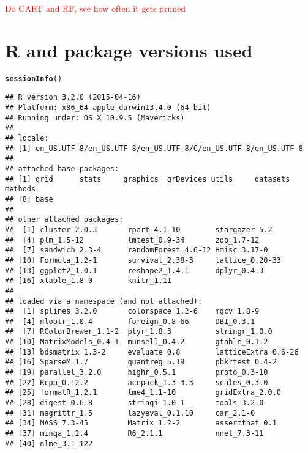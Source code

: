 \documentclass[11pt]{article}\usepackage[]{graphicx}\usepackage[]{color}
\makeatletter
\newcommand{\hlstd}[1]{\textcolor[rgb]{0.345,0.345,0.345}{#1}}%
\newcommand{\hlkwd}[1]{\textcolor[rgb]{0.737,0.353,0.396}{\textbf{#1}}}%
\newenvironment{kframe}{%
 \def\at@end@of@kframe{}%
 \ifinner\ifhmode%
  \def\at@end@of@kframe{\end{minipage}}%
  \begin{minipage}{\columnwidth}%
 \fi\fi%
 \def\FrameCommand##1{\hskip\@totalleftmargin \hskip-\fboxsep
 \colorbox{shadecolor}{##1}\hskip-\fboxsep
     \hskip-\linewidth \hskip-\@totalleftmargin \hskip\columnwidth}%
 \MakeFramed {\advance\hsize-\width
   \@totalleftmargin\z@ \linewidth\hsize
   \@setminipage}}%
 {\par\unskip\endMakeFramed%
 \at@end@of@kframe}
\newenvironment{knitrout}{}{} %
\makeatother
\begin{document}
\clearpage

\textcolor{red}{Do CART and RF, see how often it gets pruned}

\section{R and package versions used}
\begin{knitrout}
\color{fgcolor}\begin{kframe}
\begin{alltt}
\hlkwd{sessionInfo}\hlstd{()}
\end{alltt}
\begin{verbatim}
## R version 3.2.0 (2015-04-16)
## Platform: x86_64-apple-darwin13.4.0 (64-bit)
## Running under: OS X 10.9.5 (Mavericks)
## 
## locale:
## [1] en_US.UTF-8/en_US.UTF-8/en_US.UTF-8/C/en_US.UTF-8/en_US.UTF-8
## 
## attached base packages:
## [1] grid      stats     graphics  grDevices utils     datasets  methods  
## [8] base     
## 
## other attached packages:
##  [1] cluster_2.0.3       rpart_4.1-10        stargazer_5.2      
##  [4] plm_1.5-12          lmtest_0.9-34       zoo_1.7-12         
##  [7] sandwich_2.3-4      randomForest_4.6-12 Hmisc_3.17-0       
## [10] Formula_1.2-1       survival_2.38-3     lattice_0.20-33    
## [13] ggplot2_1.0.1       reshape2_1.4.1      dplyr_0.4.3        
## [16] xtable_1.8-0        knitr_1.11         
## 
## loaded via a namespace (and not attached):
##  [1] splines_3.2.0       colorspace_1.2-6    mgcv_1.8-9         
##  [4] nloptr_1.0.4        foreign_0.8-66      DBI_0.3.1          
##  [7] RColorBrewer_1.1-2  plyr_1.8.3          stringr_1.0.0      
## [10] MatrixModels_0.4-1  munsell_0.4.2       gtable_0.1.2       
## [13] bdsmatrix_1.3-2     evaluate_0.8        latticeExtra_0.6-26
## [16] SparseM_1.7         quantreg_5.19       pbkrtest_0.4-2     
## [19] parallel_3.2.0      highr_0.5.1         proto_0.3-10       
## [22] Rcpp_0.12.2         acepack_1.3-3.3     scales_0.3.0       
## [25] formatR_1.2.1       lme4_1.1-10         gridExtra_2.0.0    
## [28] digest_0.6.8        stringi_1.0-1       tools_3.2.0        
## [31] magrittr_1.5        lazyeval_0.1.10     car_2.1-0          
## [34] MASS_7.3-45         Matrix_1.2-2        assertthat_0.1     
## [37] minqa_1.2.4         R6_2.1.1            nnet_7.3-11        
## [40] nlme_3.1-122
\end{verbatim}
\end{kframe}
\end{knitrout}
\end{document}
